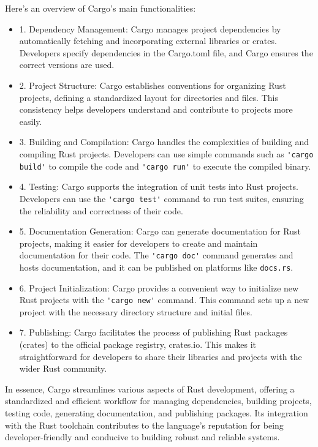 Here's an overview of Cargo's main functionalities:

\begin{itemize}
    \item 1. Dependency Management: Cargo manages project dependencies by automatically fetching and incorporating external libraries or crates. Developers specify 
        dependencies in the Cargo.toml file, and Cargo ensures the correct versions are used.
    \item 2. Project Structure: Cargo establishes conventions for organizing Rust projects, defining a standardized layout for directories and files. This consistency 
        helps developers understand and contribute to projects more easily.
    \item 3. Building and Compilation: Cargo handles the complexities of building and compiling Rust projects. Developers can use simple commands such as \verb+'cargo build'+ to 
        compile the code and \verb+'cargo run'+ to execute the compiled binary.
    \item 4. Testing: Cargo supports the integration of unit tests into Rust projects. Developers can use the \verb+'cargo test'+ command to run test suites, ensuring the 
        reliability and correctness of their code.
    \item 5. Documentation Generation: Cargo can generate documentation for Rust projects, making it easier for developers to create and maintain documentation for their 
        code. The \verb+'cargo doc'+ command generates and hosts documentation, and it can be published on platforms like \verb+docs.rs+.
    \item 6. Project Initialization: Cargo provides a convenient way to initialize new Rust projects with the \verb+'cargo new'+ command. This command sets up a new project with 
        the necessary directory structure and initial files.
    \item 7. Publishing: Cargo facilitates the process of publishing Rust packages (crates) to the official package registry, crates.io. This makes it straightforward for 
        developers to share their libraries and projects with the wider Rust community.
\end{itemize}

In essence, Cargo streamlines various aspects of Rust development, offering a standardized and efficient workflow for managing dependencies, building projects, testing 
code, generating documentation, and publishing packages. Its integration with the Rust toolchain contributes to the language's reputation for being developer-friendly and 
conducive to building robust and reliable systems.

